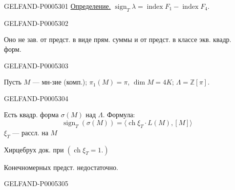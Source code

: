 \begin{GelfandAdjacentEvidence}{GELFAND-P000530}{1}
\uline{Определение.}
$\operatorname{sign}_T\lambda=\operatorname{index}F_1-\operatorname{index}F_4$.
\end{GelfandAdjacentEvidence}
\begin{GelfandAdjacentEvidence}{GELFAND-P000530}{2}


Оно не зав. от предст. в виде прям. суммы и от предст. в классе экв. квадр. форм.
\end{GelfandAdjacentEvidence}
\begin{GelfandAdjacentEvidence}{GELFAND-P000530}{3}


Пусть $M$ — мн-зие (комп.); $\pi_1(M)=\pi$, $\dim M=4K$; $\Lambda=\mathbb Z[\pi]$.
\end{GelfandAdjacentEvidence}
\begin{GelfandAdjacentEvidence}{GELFAND-P000530}{4}


Есть квадр. форма $\sigma(M)$ над $\Lambda$. Формула:
\[
\operatorname{sign}_T(\sigma(M))=
\langle \operatorname{ch}\xi_T\cdot L(M),[M]\rangle
\]
$\xi_T$ — рассл. на $M$

Хирцебрух док. при $(\operatorname{ch}\xi_T=1.)$

Конечномерных предст. недостаточно.
\end{GelfandAdjacentEvidence}
\begin{GelfandAdjacentEvidence}{GELFAND-P000530}{5}


\end{GelfandAdjacentEvidence}




